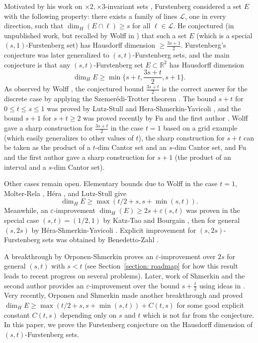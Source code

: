 \documentclass{amsart}
\newcommand{\eps}{\varepsilon}
\begin{document}
Motivated by his work on $\times 2, \times 3$-invariant sets \cite{furstenberg1970intersections}, Furstenberg considered a set $E$ with the following property: there exists a family of lines $\mathcal{L}$, one in every direction, such that $\dim_H(E\cap \ell)\geq s$ for all $\ell \in \mathcal{L}$. He conjectured (in unpublished work, but recalled by Wolff in \cite[Remark 1.5]{wolff1999recent}) that such a set $E$ (which is a special $(s, 1)$-Furstenberg set) has Hausdorff dimension $\ge \frac{3s+1}{2}$. Furstenberg's conjecture was later generalized to $(s, t)$-Furstenberg sets, and the main conjecture is that any $(s,t)$-Furstenberg set $E\subset \mathbb{R}^2$ has Hausdorff dimension
\begin{equation}
    \dim_H E \geq \min \{ s+t, \frac{3s+t}{2}, s+1\}.
\end{equation}
As observed by Wolff \cite{wolff1999recent}, the conjectured bound $\frac{3s+t}{2}$ is the correct answer for the discrete case by applying the Szemer\'edi-Trotter theorem \cite{szemeredi1983extremal}.
The bound $s+t$ for $0 \leq t\leq s \leq 1$ was proved by Lutz-Stull \cite{lutz2020bounding} and Hera-Shmerkin-Yavicoli \cite{hera2021improved},  and the bound $s+1$ for $s+t\geq 2$ was proved recently by Fu and the first author \cite{fu2021incidence}. Wolff \cite{wolff1999recent} gave a sharp construction for $\frac{3s+t}{2}$ in the case $t = 1$ based on a grid example (which easily generalizes to other values of $t$), the sharp construction for $s+t$ can be taken as the product of a $t$-dim Cantor set and an $s$-dim Cantor set, and Fu and the first author \cite{fu2021incidence} gave a sharp construction for $s+1$ (the product of an interval and a $s$-dim Cantor set).

Other cases remain open. Elementary bounds due to Wolff \cite{wolff1999recent} in the case $t = 1$,  Molter-Rela \cite{molter2012furstenberg}, H\'{e}ra \cite{hera2019hausdorff}, and Lutz-Stull \cite{lutz2020bounding} give 
\[
\dim_H E \geq \max(t/2+s, s + \min(s, t)). 
\]
Meanwhile, an $\eps$-improvement $\dim_H (E) \ge 2s+\eps(s, t)$ was proven in the special case $(s, t) = (1/2, 1)$ by Katz-Tao \cite{katz2001some} and Bourgain \cite{bourgain2003erdHos}, then for general $(s, 2s)$ by H\'{e}ra-Shmerkin-Yavicoli \cite{hera2021improved}.  Explicit improvement  for $(s, 2s)$-Furstenberg sets  was obtained by Benedetto-Zahl \cite{di2021new}. 

A breakthrough by Orponen-Shmerkin \cite{orponen2021hausdorff} proves an $\eps$-improvement over $2s$ for general $(s, t)$ with $s < t$ (see Section~\ref{section: roadmap} for how this result leads to recent progress on several problems). Later, work of Shmerkin and the second author \cite{shmerkin2022dimensions} provides an $\eps$-improvement over the bound $s + \frac{t}{2}$ using ideas in \cite{orponen2021hausdorff}.  Very recently, Orponen and Shmerkin \cite{orponen2023projections} made another breakthrough and proved $\dim_H E \geq \max(t/2 +s, s + \min(s, t)) + C(t,s)$ for some good explicit constant $C(t,s)$ depending only on $s$ and $t$ which is not far from the conjecture. In this paper, we prove the Furstenberg conjecture on the Hausdorff dimension of $(s,t)$-Furstenberg sets.
\end{document}
